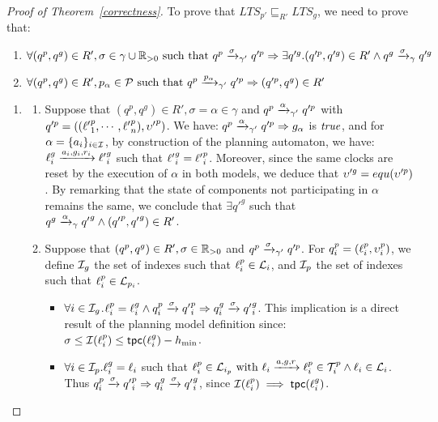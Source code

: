   \begin{proof}[Proof of Theorem~\ref{correctness}]
    To prove that $LTS_{p'}\sqsubseteq_{R'} LTS_g$, we need to prove that:

  \begin{enumerate}
    \item $\forall(q^p,q^g)\in R',\sigma\in\gamma\cup\mathbb{R}_{> 0}\text{ such that }q^p\xrightarrow{
        \sigma}_{\gamma'}q'^{p}\Rightarrow\exists q'^g.(q'^{p},q'^g)\in R'\wedge 
      q^g\xrightarrow{\sigma}_{\gamma}q'^g$
    \item $\forall(q^p,q^g)\in R',p_{\alpha}\in\mathcal{P}\text{ such that }q^p\xrightarrow{
        p_{\alpha}}_{\gamma'}q'^{p}\Rightarrow(q'^{p},q^g)\in R'$ 
  \end{enumerate}

  \begin{enumerate}
    \item
  \begin{enumerate}
    \item Suppose that $(q^p,q^g)\in R',\sigma=\alpha\in\gamma$ and $q^p\xrightarrow{\alpha}_{
        \gamma'}q'^{p}$ with $q'^p=(({\ell'}_1^p,\cdots,{\ell'}_n^p),{\upsilon'}^p)$. We have:
      $q^p\xrightarrow{\alpha}_{\gamma'}q'^{p}\Rightarrow g_{\alpha}$ is $\textnormal{\textit{true}}$, and for 
      $\alpha=\{a_i\}_{i\in\mathcal{I}}$, by construction of the planning automaton, we have:
      $\ell_i^g\xrightarrow{a_i,g_i,r_i}{\ell'}_i^g$ such that ${\ell'}_i^g={\ell'}_i^p$. Moreover, 
     since the same clocks are reset by the execution of $\alpha$ in both models, we deduce 
      that $\upsilon'^g=equ(\upsilon'^p)$. 
      By remarking that the state of components not participating in $\alpha$ remains the same, 
      we conclude that $\exists {q'}^g$ such that 
      $q^g\xrightarrow{\alpha}_{\gamma}{q'}^g\wedge({q'}^p,{q'}^g)\in R'$. 
    \item Suppose that $(q^p,q^g)\in R',\sigma\in\mathbb{R}_{> 0}$ and $q^p\xrightarrow{\sigma}_{\gamma'}
      q'^{p}$. For $q^p_i=(\ell_i^p,\upsilon_i^p)$, we define $\mathcal{I}_g$ the set of indexes such that 
       $\ell_i^p\in\mathcal{L}_i$, and $\mathcal{I}_p$ the set of indexes such that $\ell_i^p\in\mathcal{L}_{p_i}$. 
       \begin{itemize}
         \item $\forall i\in\mathcal{I}_g$.$\ell_i^p=\ell_i^g\wedge q_i^p\xrightarrow{\sigma}
           {q'}_i^p\Rightarrow q_i^g\xrightarrow{\sigma}{q'}_i^g$. This implication is a direct 
           result of the planning model definition since: $\sigma\le\mathcal{I}(\ell_i^p)\le\textsf{tpc}{}(
           \ell_i^g)-h_{\min}$.
         \item $\forall i\in\mathcal{I}_p.\ell_i^g=\ell_i$ such that $\ell^p_i\in\mathcal{L}_{i_p}\text{ with }
           \ell_i\xrightarrow{a,g,r}\ell_i^p\in\mathcal{T}_i^p\wedge\ell_i\in\mathcal{L}_i$.
           Thus $q_i^p\xrightarrow{\sigma}{q'}_i^p\Rightarrow q_i^g\xrightarrow{\sigma}{q'}_i^g$, 
           since $\mathcal{I}(\ell_i^p)\implies\textsf{tpc}{}(\ell_i^g)$.


\end{itemize}
\end{enumerate}
\end{enumerate}
\end{proof}
